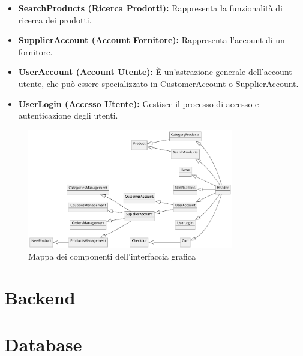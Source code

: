 \begin{itemize}
    \item \textbf{SearchProducts (Ricerca Prodotti):} Rappresenta la funzionalità di ricerca dei prodotti.
    \item \textbf{SupplierAccount (Account Fornitore):} Rappresenta l'account di un fornitore.
    \item \textbf{UserAccount (Account Utente):} È un'astrazione generale dell'account utente, che può essere specializzato in CustomerAccount o SupplierAccount.
    \item \textbf{UserLogin (Accesso Utente):} Gestisce il processo di accesso e autenticazione degli utenti.
\end{itemize}

\begin{figure}
    \centering
    \includegraphics[width=0.8\textwidth]{figures/site-map.png}
    \caption{Mappa dei componenti dell'interfaccia grafica}
    \label{fig:site-map}
\end{figure}

\section{Backend}

\section{Database}
